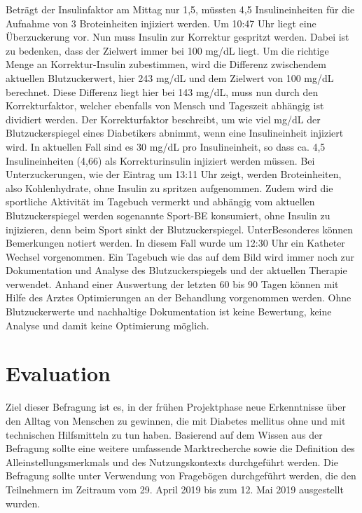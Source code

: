 \documentclass[a4paper,11pt]{article}%
\renewcommand{\\}{\vspace*{0.5\baselineskip} \newline}
\begin{document}
	Beträgt der Insulinfaktor am Mittag nur 1,5, müssten 4,5 Insulineinheiten für die Aufnahme von 3 Broteinheiten injiziert werden.\newline
	Um 10:47 Uhr liegt eine Überzuckerung vor. Nun muss Insulin zur Korrektur gespritzt werden. Dabei ist zu bedenken, dass der Zielwert immer bei 100 mg/dL liegt. Um die richtige Menge an Korrektur-Insulin zubestimmen, wird die Differenz zwischendem aktuellen Blutzuckerwert, hier 243 mg/dL und dem Zielwert von 100 mg/dL berechnet. Diese Differenz liegt hier bei 143 mg/dL, muss nun durch den Korrekturfaktor, welcher ebenfalls von Mensch und Tageszeit abhängig ist dividiert werden. Der Korrekturfaktor beschreibt, um wie viel mg/dL der Blutzuckerspiegel eines Diabetikers abnimmt, wenn eine Insulineinheit injiziert wird. In aktuellen Fall sind es 30 mg/dL pro Insulineinheit, so dass ca. 4,5 Insulineinheiten (4,66) als Korrekturinsulin injiziert werden müssen.\newline
	Bei Unterzuckerungen, wie der Eintrag um 13:11 Uhr zeigt, werden Broteinheiten, also Kohlenhydrate, ohne Insulin zu spritzen aufgenommen. Zudem wird die sportliche Aktivität im Tagebuch vermerkt und abhängig vom aktuellen Blutzuckerspiegel werden sogenannte \glqq Sport-BE \grqq{} konsumiert, ohne Insulin zu injizieren, denn beim Sport sinkt der Blutzuckerspiegel.\newline
	Unter\glqq Besonderes\grqq{} können Bemerkungen notiert werden. In diesem Fall wurde um 12:30 Uhr ein Katheter Wechsel vorgenommen.\newline
	Ein Tagebuch wie das auf dem Bild wird immer noch zur Dokumentation und Analyse des Blutzuckerspiegels und der aktuellen Therapie verwendet. Anhand einer Auswertung der letzten 60 bis 90 Tagen können mit Hilfe des Arztes Optimierungen an der Behandlung vorgenommen werden. Ohne Blutzuckerwerte und nachhaltige Dokumentation ist keine Bewertung, keine Analyse und damit keine Optimierung möglich.
	\newpage
	\section{Evaluation}
	\label{section:Evaluation}
	 Ziel dieser Befragung ist es, in der frühen Projektphase neue Erkenntnisse über den Alltag von Menschen zu gewinnen, die mit Diabetes mellitus ohne und mit technischen Hilfsmitteln zu tun haben. Basierend auf dem Wissen aus der Befragung sollte eine weitere umfassende Marktrecherche sowie die Definition des Alleinstellungsmerkmals und des Nutzungskontexts durchgeführt werden. Die Befragung sollte unter Verwendung von Fragebögen durchgeführt werden, die den Teilnehmern im Zeitraum vom 29. April 2019 bis zum 12. Mai 2019 ausgestellt wurden.
\end{document}
